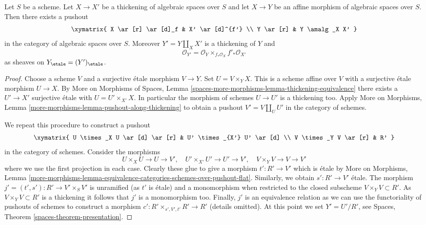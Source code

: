 \begin{lemma}
\label{lemma-pushout-along-thickening}
Let $S$ be a scheme. Let $X \to X'$ be a thickening of algebraic spaces
over $S$ and let $X \to Y$ be an affine morphism of algebraic spaces over $S$.
Then there exists a pushout
$$
\xymatrix{
X \ar[r] \ar[d]_f
&
X' \ar[d]^{f'}
\\
Y \ar[r]
&
Y \amalg_X X'
}
$$
in the category of algebraic spaces over $S$. Moreover $Y' = Y \amalg_X X'$
is a thickening of $Y$ and
$$
\mathcal{O}_{Y'} = \mathcal{O}_Y \times_{f_*\mathcal{O}_X} f'_*\mathcal{O}_{X'}
$$
as sheaves on $Y_\etale = (Y')_\etale$.
\end{lemma}

\begin{proof}
Choose a scheme $V$ and a surjective \'etale morphism $V \to Y$.
Set $U = V \times_Y X$. This is a scheme affine over $V$ with a
surjective \'etale morphism $U \to X$. By More on Morphisms of Spaces,
Lemma \ref{spaces-more-morphisms-lemma-thickening-equivalence}
there exists a $U' \to X'$
surjective \'etale with $U = U' \times_{X'} X$. In particular the
morphism of schemes $U \to U'$ is a thickening too. Apply
More on Morphisms, Lemma \ref{more-morphisms-lemma-pushout-along-thickening}
to obtain a pushout $V' = V \amalg_U U'$ in the category of schemes.

\medskip\noindent
We repeat this procedure to construct a pushout
$$
\xymatrix{
U \times_X U \ar[d] \ar[r] & U' \times_{X'} U' \ar[d] \\
V \times_Y V \ar[r] & R'
}
$$
in the category of schemes. Consider the morphisms
$$
U \times_X U \to U \to V',\quad
U' \times_{X'} U' \to U' \to V',\quad
V \times_Y V \to V \to V'
$$
where we use the first projection in each case. Clearly these glue to
give a morphism $t' : R' \to V'$ which is \'etale by
More on Morphisms, Lemma
\ref{more-morphisms-lemma-equivalence-categories-schemes-over-pushout-flat}.
Similarly, we obtain $s' : R' \to V'$ \'etale.
The morphism $j' = (t', s') : R' \to V' \times_S V'$ is unramified
(as $t'$ is \'etale) and a monomorphism when restricted to the closed
subscheme $V \times_Y V \subset R'$. As $V \times_Y V \subset R'$ is
a thickening it follows that $j'$ is a monomorphism too. Finally, $j'$
is an equivalence relation as we can use the functoriality of pushouts
of schemes to construct a morphism $c' : R' \times_{s', V', t'} R' \to R'$
(details omitted). At this point we set $Y' = U'/R'$, see
Spaces, Theorem \ref{spaces-theorem-presentation}.


\end{proof}
